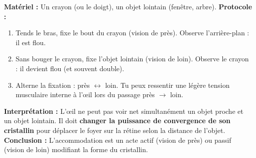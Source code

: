 \documentclass[11pt]{article}
\begin{document}
\begin{experience}
\textbf{Matériel :} Un crayon (ou le doigt), un objet lointain (fenêtre, arbre).
\textbf{Protocole :}
\begin{enumerate}
    \item Tends le bras, fixe le bout du crayon (vision de près). Observe l'arrière-plan : il est flou.
    \item Sans bouger le crayon, fixe l'objet lointain (vision de loin). Observe le crayon : il devient flou (et souvent double).
    \item Alterne la fixation : près $\leftrightarrow$ loin. Tu peux ressentir une légère tension musculaire interne à l'œil lors du passage près $\to$ loin.
\end{enumerate}
\textbf{Interprétation :} L'œil ne peut pas voir net simultanément un objet proche et un objet lointain. Il doit \textbf{changer la puissance de convergence de son cristallin} pour déplacer le foyer sur la rétine selon la distance de l'objet.
\textbf{Conclusion :} L'accommodation est un acte actif (vision de près) ou passif (vision de loin) modifiant la forme du cristallin.
\end{experience}
\end{document}
